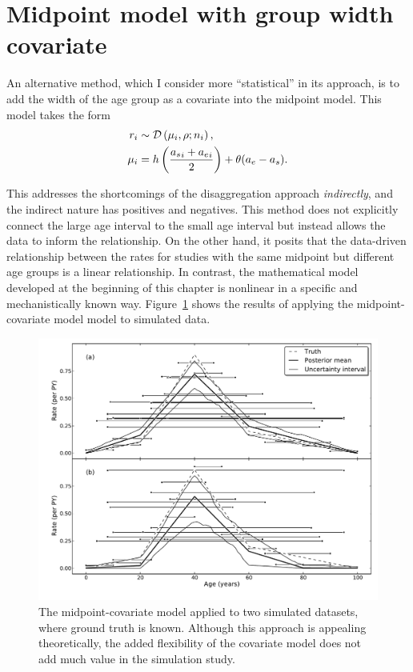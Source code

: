 \section{Midpoint model with group width covariate}
An alternative method, which I consider more ``statistical'' in its
approach, is to add the width of the age group as a covariate into the
midpoint model.  This model takes the form
\begin{align*}
r_i &\sim \mathcal{D}\left(\mu_i, \rho; n_i\right),\\
\mu_i &= h\left(\frac{{a_s}_i+{a_e}_i}{2}\right) + \theta (a_e - a_s).
\end{align*}

This addresses the shortcomings of the disaggregation approach
\emph{indirectly}, and the indirect nature has positives and
negatives.  This method does not explicitly connect the large age
interval to the small age interval but instead allows the data to
inform the relationship.  On the other hand, it posits that the
data-driven relationship between the rates for studies with the same
midpoint but different age groups is a linear relationship. In
contrast, the mathematical model developed at the beginning of this
chapter is nonlinear in
a specific and mechanistically known way.
Figure~\ref{midpoint-covariate} shows the results of applying the midpoint-covariate model
model to simulated data.


\begin{figure}[h]
\begin{center}
\includegraphics[width=\textwidth]{age_group_midpoint_covariate.pdf}
\caption{The midpoint-covariate model applied to two simulated
  datasets, where ground truth is known. Although this approach is
  appealing theoretically, the added flexibility of the covariate
  model does not add much value in the simulation study. }
\label{midpoint-covariate}
\end{center}
\end{figure}

